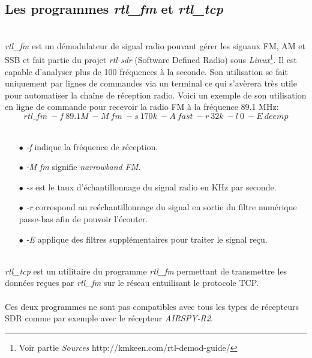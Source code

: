 \documentclass[12pt,fleqn]{book} %
\begin{document}
\subsection{Les programmes \emph{rtl\_fm} et \emph{rtl\_tcp}}
~\\\indent \emph{rtl\_fm} est un démodulateur de signal radio pouvant gérer les signaux FM, AM et SSB et fait partie du projet \emph{rtl-sdr} (Software Defined Radio) sous \emph{Linux}\footnote{Voir partie \emph{Sources} http://kmkeen.com/rtl-demod-guide/}. Il est capable d'analyser plus de 100 fréquences à la seconde. Son utilisation se fait uniquement par lignes de commandes via un terminal ce qui s'avèrera très utile pour automatiser la chaîne de réception radio.
Voici un exemple de son utilisation en ligne de commande pour recevoir la radio FM à la fréquence 89.1 MHz:
~\\$$ rtl\_fm\ -f\ 89.1M\ -M\ fm\ -s\ 170k\ -A\ fast\ -r\ 32k\ -l\ 0\ -E\ deemp $$
~\\
\begin{itemize}
 \item[$\bullet$] \emph{-f} indique la fréquence de réception.
 \item[$\bullet$] \emph{-M fm} signifie \emph{narrowband FM}.
 \item[$\bullet$] \emph{-s} est le taux d'échantillonnage du signal radio en KHz par seconde.
 \item[$\bullet$] \emph{-r} correspond au reéchantillonnage du signal en sortie du filtre numérique passe-bas afin de pouvoir l'écouter.
 \item[$\bullet$] \emph{-E} applique des filtres supplémentaires pour traiter le signal reçu.
\end{itemize}
~\\\emph{rtl\_tcp} est un utilitaire du programme \emph{rtl\_fm} permettant de transmettre les données reçues par \emph{rtl\_fm} sur le réseau entuilisant le protocole TCP.
~\\\\Ces deux programmes ne sont pas compatibles avec tous les types de récepteurs SDR comme par exemple avec le récepteur \emph{AIRSPY-R2}. 
\end{document}
